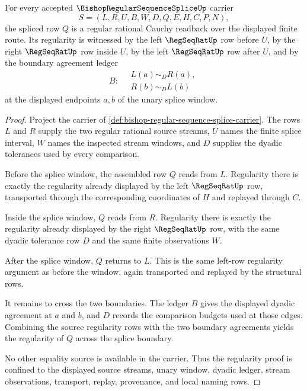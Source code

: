 \begin{theorem}
\label{thm:bishop-regular-sequence-splice-regularity}
For every accepted $\BishopRegularSequenceSpliceUp$ carrier
$$
S=(L,R,U,B,W,D,Q,E,H,C,P,N),
$$
the spliced row $Q$ is a regular rational Cauchy readback over the displayed finite route. Its regularity is witnessed by the left $\RegSeqRatUp$ row before $U$, by the right $\RegSeqRatUp$ row inside $U$, by the left $\RegSeqRatUp$ row after $U$, and by the boundary agreement ledger
$$
B:\quad
\begin{gathered}
L(a) \sim_D R(a),\\
R(b) \sim_D L(b)
\end{gathered}
$$
at the displayed endpoints $a,b$ of the unary splice window.
\end{theorem}
\begin{proof}
Project the carrier of \autoref{def:bishop-regular-sequence-splice-carrier}. The rows $L$ and $R$ supply the two regular rational source streams, $U$ names the finite splice interval, $W$ names the inspected stream windows, and $D$ supplies the dyadic tolerances used by every comparison.

Before the splice window, the assembled row $Q$ reads from $L$. Regularity there is exactly the regularity already displayed by the left $\RegSeqRatUp$ row, transported through the corresponding coordinates of $H$ and replayed through $C$.

Inside the splice window, $Q$ reads from $R$. Regularity there is exactly the regularity already displayed by the right $\RegSeqRatUp$ row, with the same dyadic tolerance row $D$ and the same finite observations $W$.

After the splice window, $Q$ returns to $L$. This is the same left-row regularity argument as before the window, again transported and replayed by the structural rows.

It remains to cross the two boundaries. The ledger $B$ gives the displayed dyadic agreement at $a$ and $b$, and $D$ records the comparison budgets used at those edges. Combining the source regularity rows with the two boundary agreements yields the regularity of $Q$ across the splice boundary.

No other equality source is available in the carrier. Thus the regularity proof is confined to the displayed source streams, unary window, dyadic ledger, stream observations, transport, replay, provenance, and local naming rows.
\end{proof}

